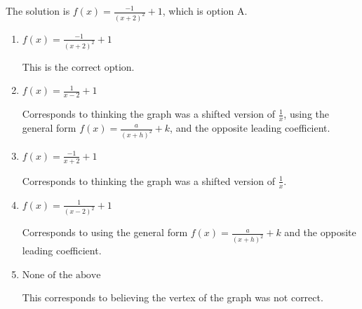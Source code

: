 \documentclass{extbook}[14pt]
\begin{document}
\begin{enumerate}
{The solution is \( f(x) = \frac{-1}{(x + 2)^2} + 1 \), which is option A.\begin{enumerate}[label=\Alph*.]
\item \( f(x) = \frac{-1}{(x + 2)^2} + 1 \)

This is the correct option.
\item \( f(x) = \frac{1}{x - 2} + 1 \)

Corresponds to thinking the graph was a shifted version of $\frac{1}{x}$, using the general form $f(x) = \frac{a}{(x+h)^2}+k$, and the opposite leading coefficient.
\item \( f(x) = \frac{-1}{x + 2} + 1 \)

Corresponds to thinking the graph was a shifted version of $\frac{1}{x}$.
\item \( f(x) = \frac{1}{(x - 2)^2} + 1 \)

Corresponds to using the general form $f(x) = \frac{a}{(x+h)^2}+k$ and the opposite leading coefficient.
\item \( \text{None of the above} \)

This corresponds to believing the vertex of the graph was not correct.
\end{enumerate}

}
\end{enumerate}
\end{document}
